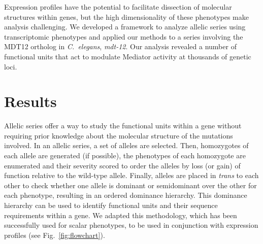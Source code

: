 \documentclass[8pt, twocolumn]{article}
\newcommand{\cel}{\emph{C.~elegans}}
\newcommand{\gene}[1]{\mbox{\emph{#1}}}
\newcommand{\dpy}{\gene{mdt-12}}
\begin{document}
Expression profiles have the potential to facilitate dissection of molecular
structures within genes, but the high dimensionality of these phenotypes make
analysis challenging. We developed a framework to analyze allelic series using
transcriptomic phenotypes and applied our methods to a series involving the
MDT12 ortholog in \cel{}, \dpy{}. Our analysis revealed a number of functional
units that act to modulate Mediator activity at thousands of genetic loci.


\section*{Results}
Allelic series offer a way to study the functional units within a gene without
requiring prior knowledge about the molecular structure of the mutations
involved. In an allelic series, a set of alleles are selected. Then, homozygotes
of each allele are generated (if possible), the phenotypes of each homozygote
are enumerated and their severity scored to order the alleles by loss (or gain)
of function relative to the wild-type allele. Finally, alleles are placed in
\emph{trans} to each other to check whether one allele is dominant or
semidominant over the other for each phenotype, resulting in an ordered
dominance hierarchy. This dominance hierarchy can be used to identify functional
units and their sequence requirements within a gene. We adapted this
methodology, which has been successfully used for scalar phenotypes, to be used
in conjunction with expression profiles (see Fig.~\ref{fig:flowchart}).
\end{document}
